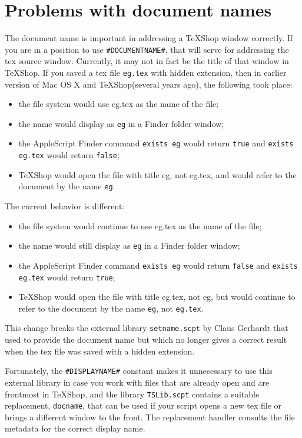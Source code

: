 \documentclass[11pt]{amsart}
\def\TeXShop{\TeX Shop\xspace}
\begin{document}
\section{Problems with document names} %
The document name is important in addressing a \TeXShop window correctly. If you are in a position to use \verb|#DOCUMENTNAME#|, that will serve  for addressing the tex source window. Currently, it may not in fact be the title of that window in \TeXShop. If you saved a tex file {\tt eg.tex} with hidden extension, then in earlier version of Mac OS X and \TeXShop (several years ago), the following took place:
\begin{itemize}
\item
the file system would use {eg.tex} as the name of the file;
\item the name would display as {\tt eg} in a Finder folder window;
\item the AppleScript Finder command {\tt exists eg} would return {\tt true} and {\tt exists eg.tex} would return {\tt false};
\item \TeXShop would open the file with title \textsf{eg}, not \textsf{eg.tex}, and would refer to the document by the name {\tt eg}.
\end{itemize}
The current behavior is different:
\begin{itemize}
\item
the file system would continue to use {eg.tex} as the name of the file;
\item the name would still display as {\tt eg} in a Finder folder window;
\item the AppleScript Finder command {\tt exists eg} would return {\tt false} and {\tt exists eg.tex} would return {\tt true};
\item \TeXShop would open the file with title \textsf{eg.tex}, not \textsf{eg}, but would continue to refer to the document by the name {\tt eg}, not {\tt eg.tex}.
\end{itemize}
This change breaks
the external library {\tt setname.scpt} by Claus Gerhardt that used to provide the document name but which no longer gives a correct result when the tex file was saved with a hidden extension. 

Fortunately, the \verb|#DISPLAYNAME#| constant makes it unnecessary to use this external library in case you work with files that are already open and are frontmost in \TeXShop, and the library {\tt TSLib.scpt} contains a suitable replacement, {\tt docname}, that can be used if your script opens a new tex file or brings a different window to the front. The replacement handler consults the file metadata for the correct display name. 
\end{document}
